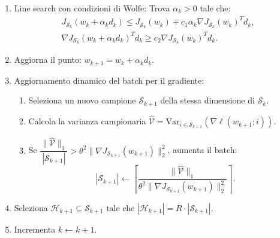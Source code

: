 \documentclass[italian, a4paper, twoside, binding=6mm]{sapthesis}
\newcommand{\Var}{\mathrm{Var}}
\begin{document}
\begin{actionbox}
\begin{enumerate}
    \item Line search con condizioni di Wolfe:
    Trova $\alpha_k > 0$ tale che:
    \[
    \begin{gathered}
    J_{\mathcal{S}_k}(w_k + \alpha_k d_k) \le J_{\mathcal{S}_k}(w_k) + c_1 \alpha_k \nabla J_{\mathcal{S}_k}(w_k)^T d_k,\\
    \nabla J_{\mathcal{S}_k}(w_k + \alpha_k d_k)^T d_k \ge c_2 \nabla J_{\mathcal{S}_k}(w_k)^T d_k.
    \end{gathered}
    \]
    
    \item Aggiorna il punto: $w_{k+1} = w_k + \alpha_k d_k$.
    
    \item Aggiornamento dinamico del batch per il gradiente:
    \begin{enumerate}
    \setlength{\itemsep}{0pt}\setlength{\topsep}{0pt}\setlength{\parskip}{0pt}
      \item Seleziona un nuovo campione $\mathcal{S}_{k+1}$ della stessa dimensione di $\mathcal{S}_k$.
      \item Calcola la varianza campionaria $\widehat{\mathcal{V}} = \Var_{i \in \mathcal{S}_{k+1}}(\nabla \ell(w_{k+1};i))$.
      \item Se $\dfrac{\|\widehat{\mathcal{V}}\|_1}{|\mathcal{S}_{k+1}|} > \theta^2 \|\nabla J_{\mathcal{S}_{k+1}}(w_{k+1})\|_2^2$, aumenta il batch:
      \[
      |\mathcal{S}_{k+1}| \leftarrow \left\lceil \dfrac{\|\widehat{\mathcal{V}}\|_1}{\theta^2 \|\nabla J_{\mathcal{S}_{k+1}}(w_{k+1})\|_2^2} \right\rceil.
      \]
    \end{enumerate}
    
    \item
    Seleziona $\mathcal{H}_{k+1} \subseteq \mathcal{S}_{k+1}$ tale che $|\mathcal{H}_{k+1}| = R \cdot |\mathcal{S}_{k+1}|$.
    
    \item Incrementa $k \leftarrow k+1$.
  \end{enumerate}
\end{actionbox}
\end{document}
